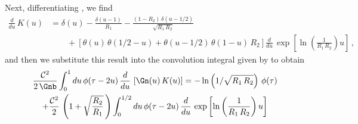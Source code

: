 Next, differentiating , we find
\begin{equation}
    \begin{split}
        \frac{d}{d u}\, K(u) &= \delta(u) - \frac{\delta(u - 1)}{R_1} - \frac{(1 - R_2)\, \delta(u - 1/2)}{\sqrt{R_1\, R_2}} \\
        &\qquad + \left[ \theta(u)\, \theta(1/2 - u) + \theta(u - 1/2)\, \theta(1 - u)\, R_2 \right] \frac{d}{d u}\, \exp\left[\ln\left(\frac{1}{R_1\, R_2}\right) u\right]\, ,
    \end{split}
\end{equation}
and then we substitute this result into the convolution integral given by  to obtain
\begin{multline}
    \frac{\mathcal{C}^2}{2\, \Gnb} \int_{0}^{1} d u\, \phi(\tau - 2 u)\, \frac{d}{d u}\, \left[\Gn(u)\, K(u)\right]
    =  - \ln\left(1/\sqrt{R_1\, R_2}\right)\, \phi(\tau) \\
    + \frac{\mathcal{C}^2}{2} \, \left( 1 + \sqrt{\frac{R_2}{R_1}}\, \right) \int_{0}^{1/2} d u\, \phi(\tau - 2 u)\, \frac{d}{d u}\, \exp\left[\ln\left(\frac{1}{R_1\, R_2}\right) u\right]
\end{multline}
